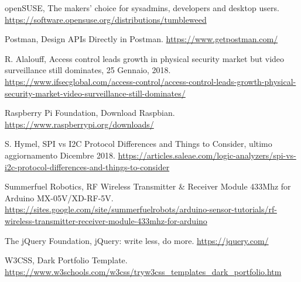 \documentclass[12pt]{report}
\begin{document}
\begin{thebibliography}{00}
%
openSUSE, The makers' choice for sysadmins, developers and desktop users.
\url{https://software.opensuse.org/distributions/tumbleweed}
%

%
Postman, Design APIs Directly in Postman.
\url{https://www.getpostman.com/}
%

%
R. Alalouff, Access control leads growth in physical security market but video surveillance still dominates, 25 Gennaio, 2018.
\url{https://www.ifsecglobal.com/access-control/access-control-leads-growth-physical-security-market-video-surveillance-still-dominates/}
%

%
Raspberry Pi Foundation, Download Raspbian.
\url{https://www.raspberrypi.org/downloads/}
%

%
S. Hymel, SPI vs I2C Protocol Differences and Things to Consider, ultimo aggiornamento Dicembre 2018.
\url{https://articles.saleae.com/logic-analyzers/spi-vs-i2c-protocol-differences-and-things-to-consider}
%

%
Summerfuel Robotics, RF Wireless Transmitter \& Receiver Module 433Mhz for Arduino MX-05V/XD-RF-5V.
\url{https://sites.google.com/site/summerfuelrobots/arduino-sensor-tutorials/rf-wireless-transmitter-receiver-module-433mhz-for-arduino}
%

%
The jQuery Foundation, jQuery: write less, do more.
\url{https://jquery.com/}
%

%
W3CSS, Dark Portfolio Template.
\url{https://www.w3schools.com/w3css/tryw3css_templates_dark_portfolio.htm}
%

\end{thebibliography}
%
\end{document}
